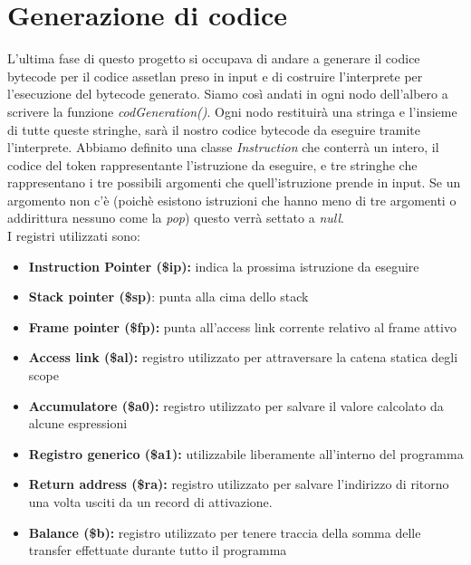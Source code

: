\documentclass[12pt, a4paper]{report}
\begin{document}
\chapter{Generazione di codice}
L'ultima fase di questo progetto si occupava di andare a generare il codice bytecode per il codice assetlan preso in input e di costruire l'interprete per l'esecuzione del bytecode generato. Siamo così andati in ogni nodo dell'albero a scrivere la funzione \emph{codGeneration()}. Ogni nodo restituirà una stringa e l'insieme di tutte queste stringhe, sarà il nostro codice bytecode da eseguire tramite l'interprete. Abbiamo definito una classe \emph{Instruction} che conterrà un intero, il codice del token rappresentante l'istruzione da eseguire, e tre stringhe che rappresentano i tre possibili argomenti che quell'istruzione prende in input. Se un argomento non c'è (poichè esistono istruzioni che hanno meno di tre argomenti o addirittura nessuno come la \emph{pop}) questo verrà settato a \emph{null}.\\
I registri utilizzati sono:
\begin{itemize}
    \item \textbf{Instruction Pointer (\$ip):} indica la prossima istruzione da eseguire
    \item \textbf{Stack pointer (\$sp)}: punta alla cima dello stack
    \item \textbf{Frame pointer (\$fp):} punta all’access link corrente relativo al frame attivo
    \item \textbf{Access link (\$al):} registro utilizzato per attraversare la catena statica degli scope
    \item \textbf{Accumulatore (\$a0):} registro utilizzato per salvare il valore calcolato da alcune espressioni
    \item \textbf{Registro generico (\$a1):} utilizzabile liberamente all’interno del programma
    \item \textbf{Return address (\$ra):} registro utilizzato per salvare l’indirizzo di ritorno una volta usciti da un
    record di attivazione.
    \item \textbf{Balance (\$b):} registro utilizzato per tenere traccia della somma delle transfer effettuate durante tutto il programma 
\end{itemize}
\end{document}
